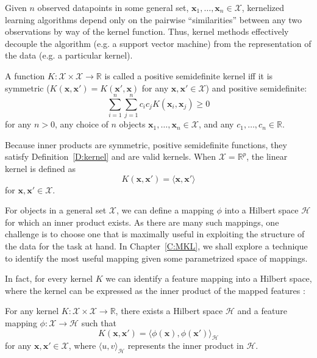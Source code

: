 Given $n$ observed datapoints in some general set, ${\mathbf x}_1, \ldots,
{\mathbf x}_n \in \mathcal{X}$,
kernelized learning algorithms depend only on the pairwise ``similarities'' between
any two observations by way of the kernel function.  Thus, kernel methods effectively
decouple the algorithm (e.g. a support vector machine) from the representation
of the data (e.g. a particular kernel).
\begin{definition}
\label{D:kernel}
A function $K: \mathcal{X} \times \mathcal{X} \to \mathbb{R}$ is called a positive
semidefinite kernel iff it is symmetric ($K(\mathbf{x}, \mathbf{x}') = K(\mathbf{x}', \mathbf{x})$ for any
$\mathbf{x}, \mathbf{x}' \in \mathcal{X}$) and positive semidefinite:
\begin{equation*}
  \sum_{i=1}^n\sum_{j=1}^nc_ic_jK(\mathbf{x}_i, \mathbf{x}_j) \geq 0
\end{equation*}
for any $n > 0$, any choice of $n$ objects $\mathbf{x}_1, \ldots, \mathbf{x}_n \in \mathcal{X}$,
and any $c_1, \ldots, c_n \in \mathbb{R}$.
\end{definition}

Because inner products are symmetric, positive semidefinite functions, they
satisfy Definition~\ref{D:kernel} and are valid kernels.  When $\mathcal{X} = \mathbb{R}^p$,
the linear kernel is defined as
\begin{equation*}
  K(\mathbf{x}, \mathbf{x'}) = \langle \mathbf{x}, \mathbf{x'} \rangle
\end{equation*}
for $\mathbf{x}, \mathbf{x'} \in \mathcal{X}$.

For objects in a general set $\mathcal{X}$, we can define a mapping $\phi$ into a
Hilbert space $\mathcal{H}$ for which an inner product exists.  As there are
many such mappings, one challenge is to choose one that is maximally
useful in exploiting the structure of the data for the task at hand.  In
Chapter~\ref{C:MKL}, we shall explore a technique to identify the most useful
mapping given some parametrized space of mappings.

In fact, for every kernel $K$ we can identify a feature mapping into a Hilbert
space, where the kernel can be expressed as the inner product of the mapped
features \cite{scholkopf2004kernel}:
\begin{theorem}
  For any kernel $K: \mathcal{X} \times \mathcal{X} \to \mathbb{R}$, there
  exists a Hilbert space $\mathcal{H}$ and a feature mapping
  $\phi: \mathcal{X} \to \mathcal{H}$ such that
  \begin{equation*}
    K(\mathbf{x}, \mathbf{x}') = \langle \phi(\mathbf{x}), \phi(\mathbf{x}') \rangle_{\mathcal{H}}
  \end{equation*}
  for any $\mathbf{x}, \mathbf{x}' \in \mathcal{X}$, where $\langle u, v \rangle_{\mathcal{H}}$
  represents the inner product in $\mathcal{H}$.
\end{theorem}

